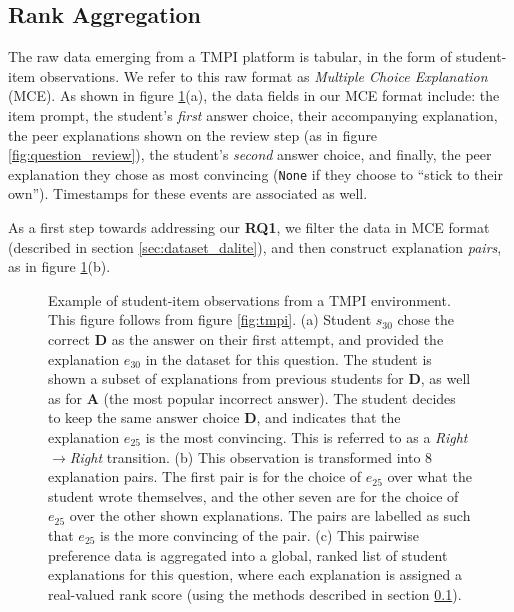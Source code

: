 \documentclass[notitlepage,12pt]{jedm}
\begin{document}
\subsection{Rank Aggregation}\label{sec:rank_agg}
The raw data emerging from a TMPI platform is tabular, in the form of 
student-item observations.
We refer to this raw format as \textit{Multiple Choice Explanation} (MCE).
As shown in figure \ref{fig:make_pairs_a}(a), the data fields in our MCE format 
include: the item prompt, the student's \textit{first} answer choice, their 
accompanying explanation, the peer explanations shown on the review step (as in 
figure \ref{fig:question_review}), the student's \textit{second} answer choice, 
and finally, the peer explanation they chose as most convincing (\verb|None| if 
they choose to ``stick to their own'').
Timestamps for these events are associated as well.

As a first step towards addressing our \textbf{RQ1}, we filter the data in MCE 
format (described in section \ref{sec:dataset_dalite}), and then construct 
explanation \textit{pairs}, as in figure \ref{fig:make_pairs_a}(b).

\begin{figure}[H]
	\centering
	\def\svgscale{0.40}
	
	\caption{
	Example of student-item observations from a TMPI environment. 
	This figure follows from figure \protect\ref{fig:tmpi}.
	(a) Student $s_{30}$ chose the correct \textbf{D} as the answer on 
	their first attempt, and provided the explanation $e_{30}$ in the 
	dataset for this question. 
	The student is shown a subset of explanations from previous students for 
	\textbf{D}, as well as for \textbf{A} (the most popular incorrect 
	answer). 
	The student decides to keep the same answer choice \textbf{D}, and 
	indicates that the explanation $e_{25}$ is the most convincing.
	This is referred to as a \textit{Right}$\rightarrow$\textit{Right} 
	transition.
	(b) This observation is transformed into 8 explanation pairs. The first 
	pair is for the choice of $e_{25}$ over what the student wrote themselves, 
	and the other seven are for the choice of $e_{25}$ over the other shown 
	explanations. 
	The pairs are labelled as such that $e_{25}$ is the more convincing of the 
	pair. 
	(c) This pairwise preference data is aggregated into a global, ranked list 
	of student explanations for this question, where each explanation is 
	assigned a real-valued rank score (using the methods described in section 
	\protect\ref{sec:rank_agg}).
}
\label{fig:make_pairs_a}
\end{figure}
\end{document}
